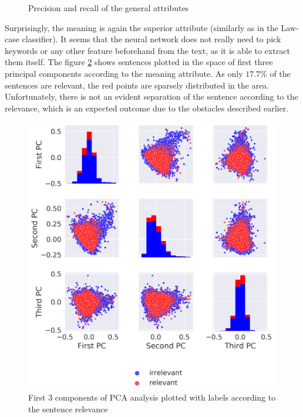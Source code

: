 \documentclass[
  digital, %
  notable,   %
  nolof,     %
  nolot,     %
  draft
]{fithesis3}
\begin{document}
\begin{figure}[h]
\begin{subfigure}{.5\textwidth}
\end{subfigure}
\caption{Precision and recall of the general attributes}
\label{fig:sent_PandR}
\end{figure}

Surprisingly, the meaning is again the superior attribute (similarly as in the Law-case classifier).
It seems that the neural network does not really need to pick keywords or any other feature beforehand from the text, as it is able to extract them itself.
The figure \ref{fig:PCA_sent_relevance} shows sentences plotted in the space of first three principal components according to the meaning attribute.
As only $17.7\%$ of the sentences are relevant, the red points are sparsely distributed in the area. Unfortunately, there is not an evident separation of the sentence according to the relevance, which is an expected outcome due to the obstacles described earlier.

\begin{figure}[h]
\caption{First 3 components of PCA analysis plotted with labels according to the sentence relevance}
\label{fig:PCA_sent_relevance}
\includegraphics[width=\textwidth]{img/PCA_sent_relevance}
\end{figure}
\end{document}
